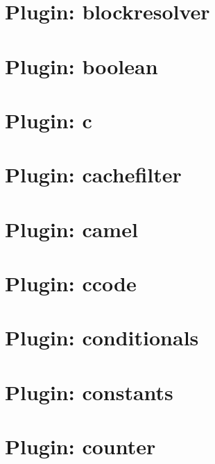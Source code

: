 \documentclass[twoside]{book}
\newcommand{\+}{\discretionary{\mbox{\scriptsize$\hookleftarrow$}}{}{}}
\begin{document}
\chapter{Plugin\+: blockresolver}
\label{md_src_plugins_blockresolver_README}

\chapter{Plugin\+: boolean}
\label{md_src_plugins_boolean_README}

\chapter{Plugin\+: c}
\label{md_src_plugins_c_README}

\chapter{Plugin\+: cachefilter}
\label{md_src_plugins_cachefilter_README}

\chapter{Plugin\+: camel}
\label{md_src_plugins_camel_README}

\chapter{Plugin\+: ccode}
\label{md_src_plugins_ccode_README}

\chapter{Plugin\+: conditionals}
\label{md_src_plugins_conditionals_README}

\chapter{Plugin\+: constants}
\label{md_src_plugins_constants_README}

\chapter{Plugin\+: counter}
\label{md_src_plugins_counter_README}

\end{document}

